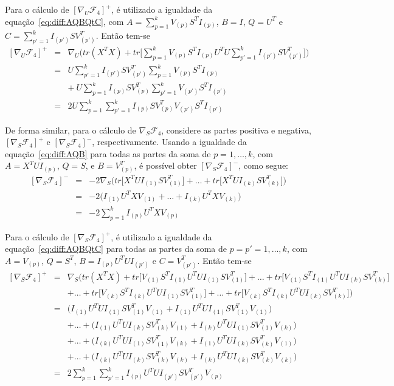 \documentclass[
    12pt,                %
    oneside,            %
    a4paper,            %
    english,            %
    brazil                %
    ]{abntex2ppgsi}
\begin{document}
Para o cálculo de $[\nabla_U \mathcal{F}_4]^+$, é utilizado a igualdade da equação~\ref{eq:diff:AQBQtC}, com $A = \sum_{p=1}^{k} V_{(p)} S^T I_{(p)}$, $B = I$, $Q = U^T$ e $C = \sum_{p'=1}^{k}I_{(p')}SV_{(p')}^T$. Então tem-se
\[
\begin{array}{lcl}
[\nabla_U \mathcal{F}_4]^+ & = & \nabla_U \Big( tr(X^TX) + tr\big[ \sum_{p=1}^{k} V_{(p)} S^T I_{(p)} U^T U \sum_{p'=1}^k I_{(p')} S V_{(p')}^T \big] \Big) \\
& = & U \sum_{p'=1}^k I_{(p')} S V_{(p')}^T \sum_{p=1}^{k} V_{(p)} S^T I_{(p)} \\
&   & + ~ U \sum_{p=1}^k I_{(p)} S V_{(p)}^T \sum_{p'=1}^{k} V_{(p')} S^T I_{(p')} \\
& = & 2 U \sum_{p=1}^k \sum_{p'=1}^{k} I_{(p)} S V_{(p)}^T V_{(p')} S^T I_{(p')}
\end{array}
\]

De forma similar, para o cálculo de $\nabla_S \mathcal{F}_4$, considere as partes positiva e negativa, $[\nabla_S \mathcal{F}_4]^+$ e $[\nabla_S \mathcal{F}_4]^-$, respectivamente.
Usando a igualdade da equação~\ref{eq:diff:AQB} para todas as partes da soma de $p = 1, \dots, k$, com $A = X^T U I_{(p)}$, $Q = S$, e $B = V_{(p)}^T$, é possível obter $[\nabla_S \mathcal{F}_4]^-$, como segue:
\[
\begin{array}{lcl}
[\nabla_S \mathcal{F}_4]^- & = & - 2 \nabla_S \Big( tr\big[ X^T U I_{(1)}SV_{(1)}^T \big] + \dots + tr\big[ X^T U I_{(k)}SV_{(k)}^T \big] \Big) \\
& = & - 2 \Big( I_{(1)} U^T X V_{(1)} + \dots + I_{(k)} U^T X V_{(k)} \Big) \\
& = & - 2 \sum_{p=1}^{k} I_{(p)} U^T X V_{(p)}
\end{array}
\]

Para o cálculo de $[\nabla_S \mathcal{F}_4]^+$, é utilizado a igualdade da equação~\ref{eq:diff:AQBQtC} para todas as partes da soma de $p = p' = 1, \dots, k$, com $A = V_{(p)}$, $Q = S^T$, $B = I_{(p)} U^T U I_{(p')}$ e $C = V_{(p')}^T$. Então tem-se
\[
\begin{array}{lcl}
[\nabla_S \mathcal{F}_4]^+ & = & \nabla_S \Big( tr(X^TX) + tr\big[ V_{(1)} S^T I_{(1)} U^T U I_{(1)} S V_{(1)}^T \big] + \dots + tr\big[ V_{(1)} S^T I_{(1)} U^T U I_{(k)} S V_{(k)}^T \big]  \\
&   & + \dots + tr\big[ V_{(k)} S^T I_{(k)} U^T U I_{(1)} S V_{(1)}^T \big] + \dots + tr\big[ V_{(k)} S^T I_{(k)} U^T U I_{(k)} S V_{(k)}^T \big] \Big) \\
& = & \big( I_{(1)} U^T U I_{(1)} S V_{(1)}^T V_{(1)} + I_{(1)} U^T U I_{(1)} S V_{(1)}^T V_{(1)} \big) \\
&   & + \dots + \big( I_{(1)} U^T U I_{(k)} S V_{(k)}^T V_{(1)} + I_{(k)} U^T U I_{(1)} S V_{(1)}^T V_{(k)} \big) \\
&   & + \dots + \big( I_{(k)} U^T U I_{(1)} S V_{(1)}^T V_{(k)} + I_{(1)} U^T U I_{(k)} S V_{(k)}^T V_{(1)} \big) \\
&   & + \dots + \big( I_{(k)} U^T U I_{(k)} S V_{(k)}^T V_{(k)} + I_{(k)} U^T U I_{(k)} S V_{(k)}^T V_{(k)} \big) \\
& = & 2 \sum_{p=1}^{k} \sum_{p'=1}^{k} I_{(p)} U^T U I_{(p')} S V_{(p')}^T V_{(p)}
\end{array}
\]
\end{document}
